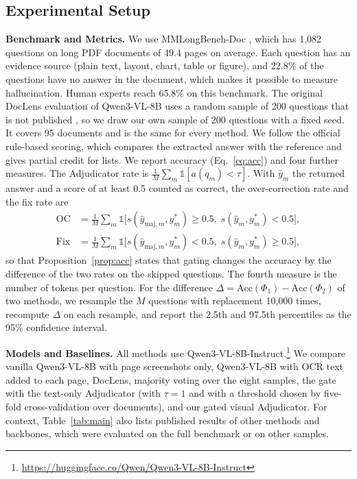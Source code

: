 \subsection{Experimental Setup}
\label{sec:setup}
\textbf{Benchmark and Metrics.} We use MMLongBench-Doc \cite{ma2024mmlongbench}, which has 1,082 questions on long PDF documents of 49.4 pages on average. Each question has an evidence source (plain text, layout, chart, table or figure), and 22.8\% of the questions have no answer in the document, which makes it possible to measure hallucination. Human experts reach 65.8\% on this benchmark. The original DocLens evaluation of Qwen3-VL-8B uses a random sample of 200 questions that is not published \cite{zhu2025doclens}, so we draw our own sample of 200 questions with a fixed seed. It covers 95 documents and is the same for every method. We follow the official rule-based scoring, which compares the extracted answer with the reference and gives partial credit for lists. We report accuracy (Eq.~\eqref{eq:acc}) and four further measures. The Adjudicator rate is $\frac{1}{M}\sum_m\mathbb{1}[a(q_m)<\tau]$. With $\hat y_m$ the returned answer and a score of at least 0.5 counted as correct, the over-correction rate and the fix rate are
\begin{equation}
\begin{aligned}
\mathrm{OC}&=\tfrac{1}{M}\textstyle\sum_m\mathbb{1}\bigl[s(\hat y_{\mathrm{maj},m},y^\ast_m)\ge0.5,\; s(\hat y_m,y^\ast_m)<0.5\bigr],\\
\mathrm{Fix}&=\tfrac{1}{M}\textstyle\sum_m\mathbb{1}\bigl[s(\hat y_{\mathrm{maj},m},y^\ast_m)<0.5,\; s(\hat y_m,y^\ast_m)\ge0.5\bigr],
\end{aligned}
\label{eq:ocfix}
\end{equation}
so that Proposition~\ref{prop:acc} states that gating changes the accuracy by the difference of the two rates on the skipped questions. The fourth measure is the number of tokens per question. For the difference $\Delta=\mathrm{Acc}(\Phi_1)-\mathrm{Acc}(\Phi_2)$ of two methods, we resample the $M$ questions with replacement 10,000 times, recompute $\Delta$ on each resample, and report the 2.5th and 97.5th percentiles as the 95\% confidence interval.

\textbf{Models and Baselines.} All methods use Qwen3-VL-8B-Instruct.\footnote{\url{https://huggingface.co/Qwen/Qwen3-VL-8B-Instruct}} We compare vanilla Qwen3-VL-8B with page screenshots only, Qwen3-VL-8B with OCR text added to each page, DocLens, majority voting over the eight samples, the gate with the text-only Adjudicator (with $\tau=1$ and with a threshold chosen by five-fold cross-validation over documents), and our gated visual Adjudicator. For context, Table~\ref{tab:main} also lists published results of other methods and backbones, which were evaluated on the full benchmark or on other samples.

